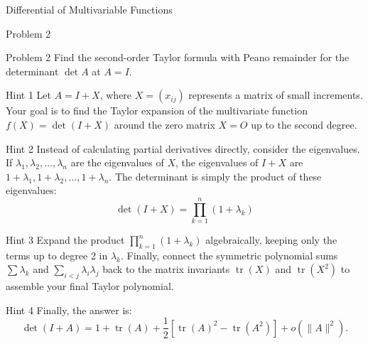 \documentclass{beamer}
\begin{document}
\begin{section}{Differential of Multivariable Functions}
\begin{subsection}{Problem 2}
    \begin{frame}
        \begin{block}{Problem 2}
            Find the second-order Taylor formula with Peano remainder for the determinant $\det A$ at $A = I$.
        \end{block}
    \end{frame}

    \begin{frame}
        \begin{block}{Hint 1}
            Let $A = I + X$, where $X = (x_{ij})$ represents a matrix of small increments. Your goal is to find the Taylor expansion of the multivariate function $f(X) = \det(I+X)$ around the zero matrix $X = O$ up to the second degree.
        \end{block}

        \pause
        \vspace{1em}
        \begin{block}{Hint 2}
            Instead of calculating partial derivatives directly, consider the eigenvalues. If $\lambda_1, \lambda_2, \dots, \lambda_n$ are the eigenvalues of $X$, the eigenvalues of $I+X$ are $1+\lambda_1, 1+\lambda_2, \dots, 1+\lambda_n$. The determinant is simply the product of these eigenvalues:
            $$
            \det(I+X) = \prod_{k=1}^n (1+\lambda_k)
            $$

        \end{block}
    \end{frame}

    \begin{frame}
        \begin{block}{Hint 3}
            Expand the product $\prod_{k=1}^n (1+\lambda_k)$ algebraically, keeping only the terms up to degree 2 in $\lambda_k$. Finally, connect the symmetric polynomial sums $\sum \lambda_k$ and $\sum_{i < j} \lambda_i \lambda_j$ back to the matrix invariants $\operatorname{tr}(X)$ and $\operatorname{tr}(X^2)$ to assemble your final Taylor polynomial.
        \end{block}
        \pause
        \vspace{1em}
        \begin{block}{Hint 4}
            Finally, the answer is:
            \[ \det (I + A) = 1 + \operatorname{tr}(A) + \frac{1}{2} \left[\operatorname{tr}(A)^2 - \operatorname{tr}(A^2) \right] + o(\|A\|^2).\]
        \end{block}
    \end{frame}
\end{subsection}


\end{section}
\end{document}
